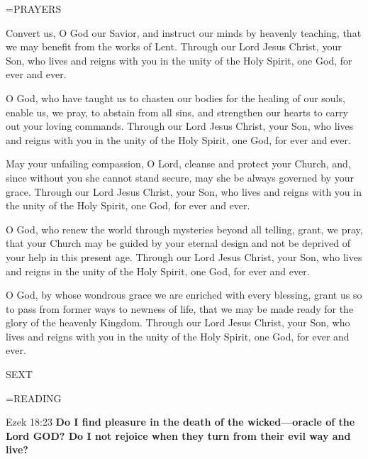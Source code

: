 \hangindent=\parindent \small PRAYERS
\begin{description}[labelindent=\parindent, leftmargin=*]
\item [Week 1:] 	Convert us, O God our Savior, and instruct our minds by heavenly teaching, that we may benefit from the works of Lent. Through our Lord Jesus Christ, your Son, who lives and reigns with you in the unity of the Holy Spirit, one God, for ever and ever.
\item [Week 2:] 	O God, who have taught us to chasten our bodies for the healing of our souls, enable us, we pray, to abstain from all sins, and strengthen our hearts to carry out your loving commands. Through our Lord Jesus Christ, your Son, who lives and reigns with you in the unity of the Holy Spirit, one God, for ever and ever.
\item [Week 3:] 	May your unfailing compassion, O Lord, cleanse and protect your Church, and, since without you she cannot stand secure, may she be always governed by your grace. Through our Lord Jesus Christ, your Son, who lives and reigns with you in the unity of the Holy Spirit, one God, for ever and ever.
\item [Week 4:] 	O God, who renew the world through mysteries beyond all telling, grant, we pray, that your Church may be guided by your eternal design and not be deprived of your help in this present age. Through our Lord Jesus Christ, your Son, who lives and reigns in the unity of the Holy Spirit, one God, for ever and ever.
\item [Week 5:] 	O God, by whose wondrous grace we are enriched with every blessing, grant us so to pass from former ways to newness of life, that we may be made ready for the glory of the heavenly Kingdom. Through our Lord Jesus Christ, your Son, who lives and reigns with you in the unity of the Holy Spirit, one God, for ever and ever.
\end{description}

\begin{flushleft}\normalsize SEXT\\\end{flushleft}
\hangindent=\parindent \small READING
\begin{description}[labelindent=\parindent, leftmargin=*]
\item [Weeks 1-4:]     Ezek 18:23 \textbf{    Do I find pleasure in the death of the wicked—oracle of the Lord GOD? Do I not rejoice when they turn from their evil way and live? \\}
\end{description}

